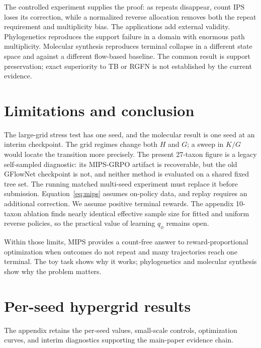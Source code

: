 \documentclass[11pt]{article}
\begin{document}
The controlled experiment supplies the proof: as repeats disappear, count IPS
loses its correction, while a normalized reverse allocation removes both the
repeat requirement and multiplicity bias. The applications add external
validity. Phylogenetics reproduces the support failure in a domain with
enormous path multiplicity. Molecular synthesis reproduces terminal collapse
in a different state space and against a different flow-based baseline. The
common result is support preservation; exact superiority to TB or RGFN is not
established by the current evidence.

\section{Limitations and conclusion}

The large-grid stress test has one seed, and the molecular result is one seed
at an interim checkpoint. The grid regimes change both \(H\) and \(G\); a
sweep in \(K/G\) would locate the transition more precisely. The present
27-taxon figure is a legacy self-sampled diagnostic: its MIPS-GRPO artifact is
recoverable, but the old GFlowNet checkpoint is not, and neither method is
evaluated on a shared fixed tree set. The running matched multi-seed experiment
must replace it before submission. Equation~\eqref{eq:mips} assumes on-policy
data, and replay requires an additional correction. We assume positive
terminal rewards. The appendix 10-taxon ablation finds nearly identical
effective sample size for fitted and uniform reverse policies, so the practical
value of learning \(q_\phi\) remains open.

Within those limits, MIPS provides a count-free answer to reward-proportional
optimization when outcomes do not repeat and many trajectories reach one
terminal. The toy task shows why it works; phylogenetics and molecular
synthesis show why the problem matters.

\clearpage
\appendix
\setcounter{figure}{0}
\setcounter{table}{0}
\renewcommand{\thefigure}{A\arabic{figure}}
\renewcommand{\thetable}{A\arabic{table}}
\renewcommand{\theHfigure}{appendix.\arabic{figure}}
\renewcommand{\theHtable}{appendix.\arabic{table}}

\section{Per-seed hypergrid results}

The appendix retains the per-seed values, small-scale controls, optimization
curves, and interim diagnostics supporting the main-paper evidence chain.
\end{document}
